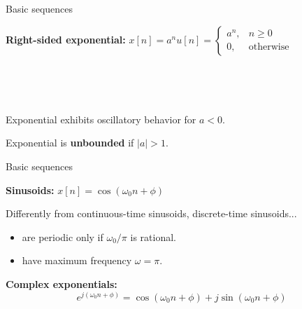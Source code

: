 \documentclass[10pt]{beamer}
\begin{document}
%
\begin{frame}{Basic sequences}
	
\textbf{Right-sided exponential:} $\displaystyle 
x[n] = a^nu[n] = \begin{cases}
a^n, & n \geq 0 \\
0, & \text{otherwise}
\end{cases}$
	
\begin{figure}[h!] 
	\centering 
	\begin{subfigure}[h!]{0.32\textwidth} 
	\end{subfigure}%
	~ %
	\begin{subfigure}[h!]{0.32\textwidth} 
	\end{subfigure}%

	\begin{subfigure}[h!]{0.32\textwidth} 
	\end{subfigure}%
	~ %
	\begin{subfigure}[h!]{0.32\textwidth} 
	\end{subfigure}%
\end{figure}

Exponential exhibits oscillatory behavior for $a < 0$.

Exponential is \textbf{unbounded} if $|a| > 1$.
\end{frame}

%
\begin{frame}{Basic sequences}
	
	\textbf{Sinusoids:} $\displaystyle
	x[n] = \cos(\omega_0 n + \phi)$
	\vspace{-0.2cm}
	\begin{figure}[t!]
		\centering
		\resizebox{0.4\linewidth}{!}{}
		\label{fig:sinusoid}
	\end{figure}

	Differently from continuous-time sinusoids, discrete-time sinusoids...
	\begin{itemize}
		\item are periodic only if $\omega_0/\pi$ is rational.
		\item have maximum frequency $\omega = \pi$.
	\end{itemize}
	
	\pause	
	\textbf{Complex exponentials:} 
	\begin{equation*}
		e^{j(\omega_0n + \phi)} = \cos(\omega_0 n + \phi) + j\sin(\omega_0 n + \phi) \tag{from Euler's equation}
	\end{equation*}
\end{frame}
\end{document}
